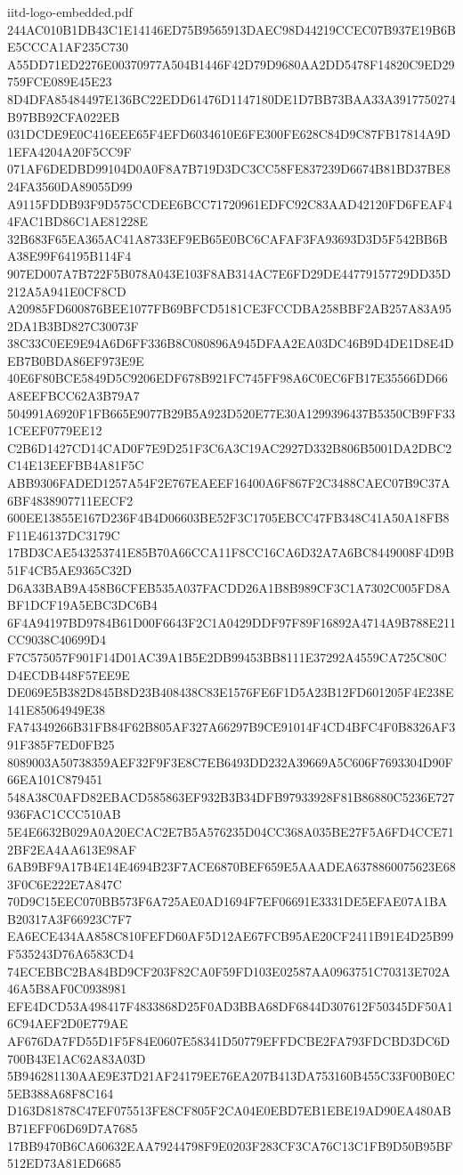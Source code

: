 \begin{filecontents*}[overwrite]{iitd-logo-embedded.pdf}
244AC010B1DB43C1E14146ED75B9565913DAEC98D44219CCEC07B937E19B6BE5CCCA1AF235C730
A55DD71ED2276E00370977A504B1446F42D79D9680AA2DD5478F14820C9ED29759FCE089E45E23
8D4DFA85484497E136BC22EDD61476D1147180DE1D7BB73BAA33A3917750274B97BB92CFA022EB
031DCDE9E0C416EEE65F4EFD6034610E6FE300FE628C84D9C87FB17814A9D1EFA4204A20F5CC9F
071AF6DEDBD99104D0A0F8A7B719D3DC3CC58FE837239D6674B81BD37BE824FA3560DA89055D99
A9115FDDB93F9D575CCDEE6BCC71720961EDFC92C83AAD42120FD6FEAF44FAC1BD86C1AE81228E
32B683F65EA365AC41A8733EF9EB65E0BC6CAFAF3FA93693D3D5F542BB6BA38E99F64195B114F4
907ED007A7B722F5B078A043E103F8AB314AC7E6FD29DE44779157729DD35D212A5A941E0CF8CD
A20985FD600876BEE1077FB69BFCD5181CE3FCCDBA258BBF2AB257A83A952DA1B3BD827C30073F
38C33C0EE9E94A6D6FF336B8C080896A945DFAA2EA03DC46B9D4DE1D8E4DEB7B0BDA86EF973E9E
40E6F80BCE5849D5C9206EDF678B921FC745FF98A6C0EC6FB17E35566DD66A8EEFBCC62A3B79A7
504991A6920F1FB665E9077B29B5A923D520E77E30A1299396437B5350CB9FF331CEEF0779EE12
C2B6D1427CD14CAD0F7E9D251F3C6A3C19AC2927D332B806B5001DA2DBC2C14E13EEFBB4A81F5C
ABB9306FADED1257A54F2E767EAEEF16400A6F867F2C3488CAEC07B9C37A6BF4838907711EECF2
600EE13855E167D236F4B4D06603BE52F3C1705EBCC47FB348C41A50A18FB8F11E46137DC3179C
17BD3CAE543253741E85B70A66CCA11F8CC16CA6D32A7A6BC8449008F4D9B51F4CB5AE9365C32D
D6A33BAB9A458B6CFEB535A037FACDD26A1B8B989CF3C1A7302C005FD8ABF1DCF19A5EBC3DC6B4
6F4A94197BD9784B61D00F6643F2C1A0429DDF97F89F16892A4714A9B788E211CC9038C40699D4
F7C575057F901F14D01AC39A1B5E2DB99453BB8111E37292A4559CA725C80CD4ECDB448F57EE9E
DE069E5B382D845B8D23B408438C83E1576FE6F1D5A23B12FD601205F4E238E141E85064949E38
FA74349266B31FB84F62B805AF327A66297B9CE91014F4CD4BFC4F0B8326AF391F385F7ED0FB25
8089003A50738359AEF32F9F3E8C7EB6493DD232A39669A5C606F7693304D90F66EA101C879451
548A38C0AFD82EBACD585863EF932B3B34DFB97933928F81B86880C5236E727936FAC1CCC510AB
5E4E6632B029A0A20ECAC2E7B5A576235D04CC368A035BE27F5A6FD4CCE712BF2EA4AA613E98AF
6AB9BF9A17B4E14E4694B23F7ACE6870BEF659E5AAADEA6378860075623E683F0C6E222E7A847C
70D9C15EEC070BB573F6A725AE0AD1694F7EF06691E3331DE5EFAE07A1BAB20317A3F66923C7F7
EA6ECE434AA858C810FEFD60AF5D12AE67FCB95AE20CF2411B91E4D25B99F535243D76A6583CD4
74ECEBBC2BA84BD9CF203F82CA0F59FD103E02587AA0963751C70313E702A46A5B8AF0C0938981
EFE4DCD53A498417F4833868D25F0AD3BBA68DF6844D307612F50345DF50A16C94AEF2D0E779AE
AF676DA7FD55D1F5F84E0607E58341D50779EFFDCBE2FA793FDCBD3DC6D700B43E1AC62A83A03D
5B946281130AAE9E37D21AF24179EE76EA207B413DA753160B455C33F00B0EC5EB388A68F8C164
D163D81878C47EF075513FE8CF805F2CA04E0EBD7EB1EBE19AD90EA480ABB71EFF06D69D7A7685
17BB9470B6CA60632EAA79244798F9E0203F283CF3CA76C13C1FB9D50B95BF512ED73A81ED6685

\end{filecontents*}

